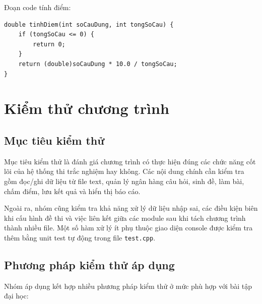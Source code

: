 \documentclass[12pt,a4paper]{report}
\begin{document}
Đoạn code tính điểm:

\begin{lstlisting}[style=cppstyle, caption={Hàm tính điểm theo thang 10}]
double tinhDiem(int soCauDung, int tongSoCau) {
    if (tongSoCau <= 0) {
        return 0;
    }
    return (double)soCauDung * 10.0 / tongSoCau;
}
\end{lstlisting}

\section{Kiểm thử chương trình}

\subsection{Mục tiêu kiểm thử}

Mục tiêu kiểm thử là đánh giá chương trình có thực hiện đúng các chức năng cốt lõi của hệ thống thi trắc nghiệm hay không. Các nội dung chính cần kiểm tra gồm đọc/ghi dữ liệu từ file text, quản lý ngân hàng câu hỏi, sinh đề, làm bài, chấm điểm, lưu kết quả và hiển thị báo cáo.

Ngoài ra, nhóm cũng kiểm tra khả năng xử lý dữ liệu nhập sai, các điều kiện biên khi cấu hình đề thi và việc liên kết giữa các module sau khi tách chương trình thành nhiều file. Một số hàm xử lý ít phụ thuộc giao diện console được kiểm tra thêm bằng unit test tự động trong file \texttt{test.cpp}.

\subsection{Phương pháp kiểm thử áp dụng}

Nhóm áp dụng kết hợp nhiều phương pháp kiểm thử ở mức phù hợp với bài tập đại học:
\end{document}
